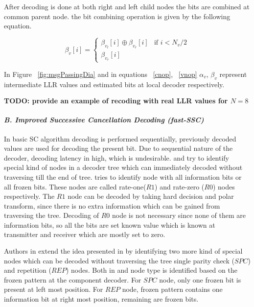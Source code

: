 After decoding is done at both right and left child nodes the bits are combined at common parent node. the bit combining operation is given by the following equation.

\begin{equation*} \label{bitCombination}
\beta_{v}[i] = \begin{cases}
				\beta_{v_{l}}[i] \oplus \beta_{v_{r}}[i] & \text{if }i < N_{v}/2 \\
				\beta_{v_{r}}[i]
				\end{cases}
\end{equation*}

In Figure ~\ref{fig:msgPassingDia} and in equations ~\ref{cnop}, ~\ref{vnop}  $\alpha_{v}$, $\beta_{v}$ represent intermediate LLR values and estimated bits at local decoder respectively.


\textbf{TODO: provide an example of recoding with real LLR values for $N = 8$}

\paragraph{\emph{B. Improved Successive Cancellation Decoding (fast-SSC)}\newline}  \label{fastSSC} 
In basic SC algorithm decoding is performed sequentially, previously decoded values are used for decoding the present bit. Due to sequential nature of the decoder, decoding latency in high, which is undesirable. \cite{SSC} and \cite{fastSSC} try to identify special kind of nodes in a decoder tree which can immediately decoded without traversing till the end of tree. \cite{SSC} tries to identify node with all information bits or all frozen bits. These nodes are called rate-one($R1$) and rate-zero ($R0$) nodes respectively. The $R1$ node can be decoded by taking hard decision and polar transform, since there is no extra information which can be gained from traversing the tree. Decoding of $R0$ node is not necessary since none of them are information bits, so all the bits are set known value which is known at transmitter and receiver which are mostly set to zero. \par Authors in \cite{fastSSC} extend the idea presented in \cite{SSC} by identifying two more kind of special nodes which can be decoded without traversing the tree single parity check ($SPC$) and repetition ($REP$) nodes. Both in \cite{SSC} and \cite{fastSSC} node type is identified based on the frozen pattern at the component decoder. For $SPC$ node, only one frozen bit is present at left most position. For $REP$ node, frozen pattern contains one information bit at right most position, remaining are frozen bits.

